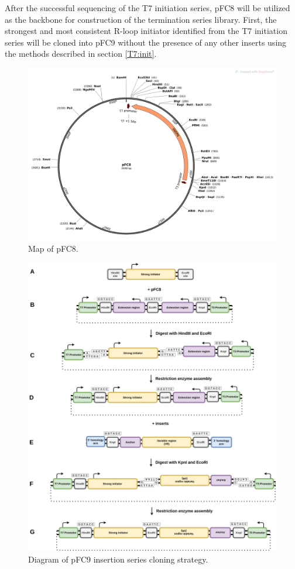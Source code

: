 \documentclass[11pt]{article}
\begin{document}
After the successful sequencing of the T7 initiation series, pFC8 will be utilized as the backbone for construction of the termination series library. First, the strongest and most consistent R-loop initiator identified from the T7 initiation series will be cloned into pFC9 without the presence of any other inserts using the methods described in section \ref{T7:init}. 

\begin{figure}[H]
	\includegraphics[width=12cm]{images/plasmid_maps/pFC8_Map.png}
	\centering
	\caption{Map of pFC8.}
	\label{fig:pFC8}
\end{figure}

\begin{figure}[H]
	\includegraphics[width=15cm]{images/cloning_diagrams/construct_diagrams-T7-termination-series.png}
	\centering
	\caption{Diagram of pFC9 insertion series cloning strategy.}
\end{figure}
\end{document}
